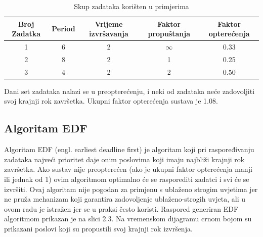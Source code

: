 \documentclass[../zavrsni.tex]{subfiles}
\begin{document}
\begin{table}[h!]
    \begin{center}
      \begin{tabular}{||c || c c c c||} 
       \hline
       Broj Zadatka & Period & Vrijeme izvršavanja & Faktor propuštanja & Faktor opterećenja \\ [0.5ex] 
       \hline\hline
       1 & 6 & 2 & $\infty$ & 0.33 \\ 
       \hline
       2 & 8 & 2 & 1 & 0.25 \\
       \hline
       3 & 4 & 2 & 2 & 0.50 \\
       \hline
      \end{tabular}
    \end{center}
    \caption{\label{tab:table-name}Skup zadataka korišten u primjerima}
    \end{table}

Dani set zadataka nalazi se u preopterećenju, i neki od zadataka neće zadovoljiti svoj krajnji rok završetka. Ukupni faktor opterećenja
sustava je 1.08.

\subsection{Algoritam EDF}

Algoritam EDF (engl. earliest deadline first) je algoritam koji pri raspoređivanju zadataka najveći prioritet daje onim poslovima 
koji imaju najbliži krajnji rok završetka. 
Ako sustav nije preopterećen (ako je ukupni faktor opterećenja manji ili jednak od 1) 
ovim algoritmom optimalno će se rasporediti zadatci i svi će se izvršiti. Ovaj algoritam nije pogodan za primjenu s ublaženo strogim uvjetima 
jer ne pruža mehanizam koji garantira zadovoljenje ublaženo-strogih uvjeta,  
ali u ovom radu je istražen jer se u praksi često koristi. 
Raspored generiran EDF algoritmom prikazan je na slici 2.3.
Na vremenskom dijagramu crnom bojom su prikazani poslovi koji su propustili svoj krajnji rok izvršenja.
\end{document}
